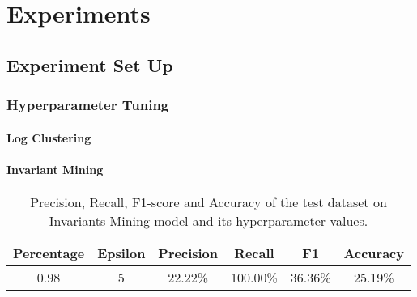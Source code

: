 \chapter{Experiments}

\section{Experiment Set Up}

\subsection{Hyperparameter Tuning}
\label{appendix:hyperparameterTuning}
\subsubsection{Log Clustering}
\begin{table}[h]
\centering
{}
    \caption{Precision, Recall, F1-score and Accuracy of the test dataset on Log Clustering model with different hyperparameter values.}
    \label{tab:pca_tuning}
\end{table}

\subsubsection{Invariant Mining}

\begin{table}[h]
\centering
\begin{tabular}{@{}cccccc@{}}
\toprule
Percentage & Epsilon & \textbf{Precision} & \textbf{Recall} & \textbf{F1} & \textbf{Accuracy} \\ \midrule
0.98       & 5       & 22.22\%               & 100.00\%               & 36.36\%      & 25.19\%            
\end{tabular}
    \caption{Precision, Recall, F1-score and Accuracy of the test dataset on Invariants Mining model and its hyperparameter values.}
    \label{tab:pca_tuning}
\end{table}

